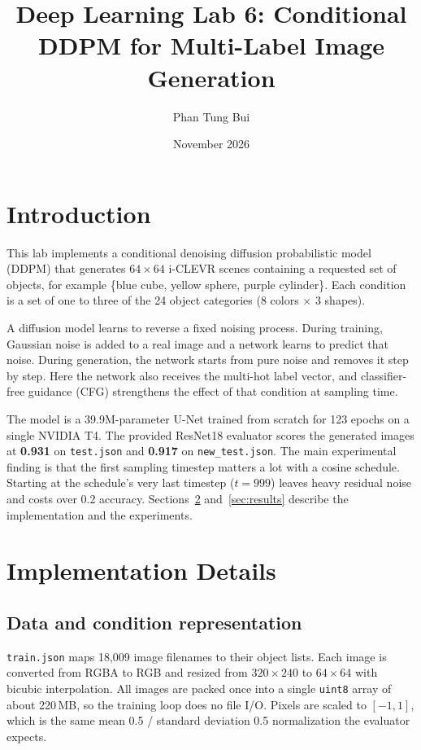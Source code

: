 \documentclass[11pt]{article}
\title{Deep Learning Lab 6: Conditional DDPM for Multi-Label Image Generation}
\author{Phan Tung Bui \quad 115550809}
\date{November 2026}
\begin{document}
\maketitle

\section{Introduction}
This lab implements a conditional denoising diffusion probabilistic model (DDPM)
that generates $64\times64$ i-CLEVR scenes containing a requested set of objects,
for example \{blue cube, yellow sphere, purple cylinder\}. Each condition is a set of
one to three of the 24 object categories (8 colors $\times$ 3 shapes).

A diffusion model learns to reverse a fixed noising process. During training, Gaussian
noise is added to a real image and a network learns to predict that noise. During
generation, the network starts from pure noise and removes it step by step. Here the
network also receives the multi-hot label vector, and classifier-free guidance (CFG)
strengthens the effect of that condition at sampling time.

The model is a 39.9M-parameter U-Net trained from scratch for 123 epochs on a single
NVIDIA T4. The provided ResNet18 evaluator scores the generated images at
\textbf{0.931} on \texttt{test.json} and \textbf{0.917} on \texttt{new\_test.json}.
The main experimental finding is that the first sampling timestep matters a lot with a
cosine schedule. Starting at the schedule's very last timestep ($t=999$) leaves heavy
residual noise and costs over 0.2 accuracy. Sections~\ref{sec:impl} and~\ref{sec:results} describe the implementation
and the experiments.

\section{Implementation Details}\label{sec:impl}

\subsection{Data and condition representation}
\texttt{train.json} maps 18,009 image filenames to their object lists. Each image is
converted from RGBA to RGB and resized from $320\times240$ to $64\times64$ with bicubic
interpolation. All images are packed once into a single \texttt{uint8} array of about
220\,MB, so the training loop does no file I/O. Pixels are scaled to $[-1,1]$, which is
the same mean 0.5 / standard deviation 0.5 normalization the evaluator expects.
\end{document}
